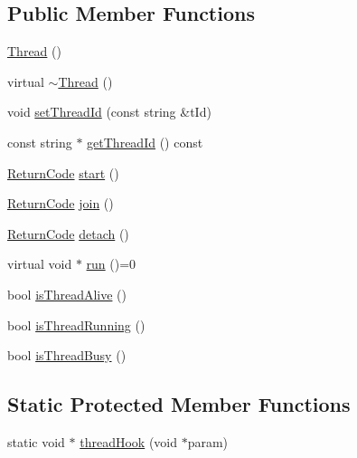\subsection*{Public Member Functions}
\begin{DoxyCompactItemize}
\item 
\hyperlink{classit_1_1testbench_1_1rte_1_1Thread_afdd03f099d4e37cfb18c10ad8e4e4130}{Thread} ()
\item 
virtual \hyperlink{classit_1_1testbench_1_1rte_1_1Thread_a15a6af58354a5ab748516b05e14b7951}{$\sim$\-Thread} ()
\item 
void \hyperlink{classit_1_1testbench_1_1rte_1_1Thread_a857850320841d000d9be9d70e2d0e6c5}{set\-Thread\-Id} (const string \&t\-Id)
\item 
const string $\ast$ \hyperlink{classit_1_1testbench_1_1rte_1_1Thread_a87e0b1517237b4484185a24709e20b92}{get\-Thread\-Id} () const 
\item 
\hyperlink{structit_1_1testbench_1_1data_1_1ReturnCode}{Return\-Code} \hyperlink{classit_1_1testbench_1_1rte_1_1Thread_a3898d6f11d61bc45bd0e955d220517e0}{start} ()
\item 
\hyperlink{structit_1_1testbench_1_1data_1_1ReturnCode}{Return\-Code} \hyperlink{classit_1_1testbench_1_1rte_1_1Thread_abc34d6a5f94f0eb5d1f74532197c8ac2}{join} ()
\item 
\hyperlink{structit_1_1testbench_1_1data_1_1ReturnCode}{Return\-Code} \hyperlink{classit_1_1testbench_1_1rte_1_1Thread_afb9b601b26126e13200653edcc952ae6}{detach} ()
\item 
virtual void $\ast$ \hyperlink{classit_1_1testbench_1_1rte_1_1Thread_a52ddbcd22cd6493de8453458d2a0652d}{run} ()=0
\item 
bool \hyperlink{classit_1_1testbench_1_1rte_1_1Thread_a7bcb9a82de006162108a473b6d8c0596}{is\-Thread\-Alive} ()
\item 
bool \hyperlink{classit_1_1testbench_1_1rte_1_1Thread_a6908d4609cff32bf32672037c4926f49}{is\-Thread\-Running} ()
\item 
bool \hyperlink{classit_1_1testbench_1_1rte_1_1Thread_a663e89ee955f57f4810ef909cb61620f}{is\-Thread\-Busy} ()
\end{DoxyCompactItemize}
\subsection*{Static Protected Member Functions}
\begin{DoxyCompactItemize}
\item 
static void $\ast$ \hyperlink{classit_1_1testbench_1_1rte_1_1Thread_acd6c0156037661c5558d2241cb3e4a60}{thread\-Hook} (void $\ast$param)
\end{DoxyCompactItemize}
